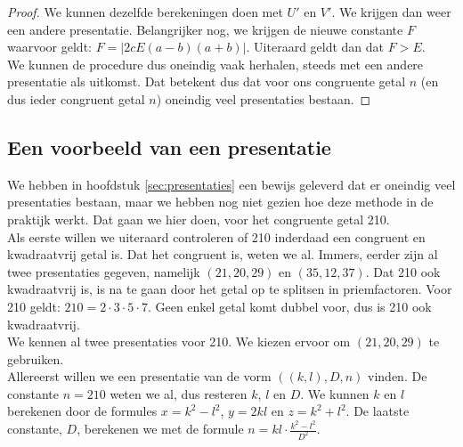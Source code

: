 \documentclass[12pt,reqno]{article}
\theoremstyle{theorem}
\theoremstyle{definition}
\begin{document}
\begin{proof}
		We kunnen dezelfde berekeningen doen met $U'$ en $V'$. We krijgen dan weer een andere presentatie. Belangrijker nog, we krijgen de nieuwe constante $F$ waarvoor geldt: $F=|2 c E (a-b) (a+b)|.$ Uiteraard geldt dan dat $F > E$.\\
		
		We kunnen de procedure dus oneindig vaak herhalen, steeds met een andere presentatie als uitkomst. Dat betekent dus dat voor ons congruente getal $n$ (en dus ieder congruent getal $n$) oneindig veel presentaties bestaan.
	\end{proof}
	
	\subsection{Een voorbeeld van een presentatie}
	We hebben in hoofdstuk \ref{sec:presentaties} een bewijs geleverd dat er oneindig veel presentaties bestaan, maar we hebben nog niet gezien hoe deze methode in de praktijk werkt. Dat gaan we hier doen, voor het congruente getal 210.\\
	
	Als eerste willen we uiteraard controleren of 210 inderdaad een congruent en kwadraatvrij getal is. Dat het congruent is, weten we al. Immers, eerder zijn al twee presentaties gegeven, namelijk $(21,20,29)$ en $(35,12,37)$. Dat 210 ook kwadraatvrij is, is na te gaan door het getal op te splitsen in priemfactoren. Voor 210 geldt: $210 = 2 \cdot 3 \cdot 5 \cdot 7$. Geen enkel getal komt dubbel voor, dus is 210 ook kwadraatvrij.\\
	
	We kennen al twee presentaties voor 210. We kiezen ervoor om $(21,20,29)$ te gebruiken.\\
	
	Allereerst willen we een presentatie van de vorm $((k,l),D,n)$ vinden. De constante $n=210$ weten we al, dus resteren $k$, $l$ en $D$. We kunnen $k$ en $l$ berekenen door de formules $x = k^2 - l^2$, $y = 2kl$ en $z = k^2 + l^2$. De laatste constante, $D$, berekenen we met de formule $n = kl \cdot \frac{k^2-l^2}{D^2}$.\\
	
\end{document}
